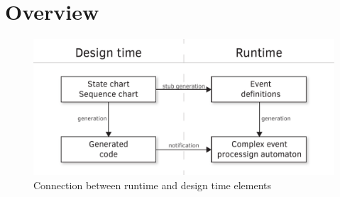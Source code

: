 \chapter{Overview}
\label{chap:overview}

\begin{figure}[h]
	\centering
	\includegraphics[width=0.75\linewidth]{include/figures/chapter_3/abstract_diagram}
	\caption{Connection between runtime and design time elements}
	\label{fig:case_study:concept_component}
\end{figure}